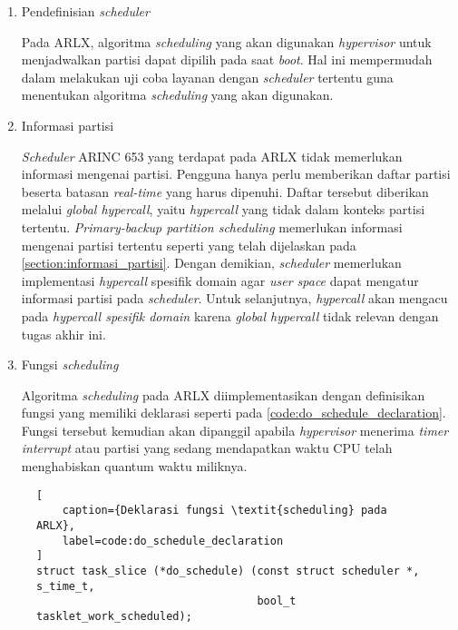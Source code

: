 \begin{enumerate}
	
	\item Pendefinisian \textit{scheduler}

		Pada ARLX, algoritma \textit{scheduling} yang akan digunakan \textit{hypervisor}
		untuk menjadwalkan partisi dapat dipilih pada saat \textit{boot}. Hal ini
		mempermudah dalam melakukan uji coba layanan dengan \textit{scheduler} tertentu
		guna menentukan algoritma \textit{scheduling} yang akan digunakan.
		
	\item Informasi partisi

		\textit{Scheduler} ARINC 653 yang terdapat pada ARLX tidak memerlukan informasi
		mengenai partisi. Pengguna hanya perlu memberikan daftar partisi beserta batasan
		\textit{real-time} yang harus dipenuhi. Daftar tersebut diberikan melalui
		\textit{global hypercall}, yaitu \textit{hypercall} yang tidak dalam konteks
		partisi tertentu. \textit{Primary-backup partition scheduling} memerlukan
		informasi mengenai partisi tertentu seperti yang telah dijelaskan pada
		\autoref{section:informasi_partisi}. Dengan demikian, \textit{scheduler}
		memerlukan implementasi \textit{hypercall} spesifik domain agar \textit{user
		space} dapat mengatur informasi partisi pada \textit{scheduler}. Untuk
		selanjutnya, \textit{hypercall} akan mengacu pada \textit{hypercall spesifik
		domain} karena \textit{global hypercall} tidak relevan dengan tugas akhir ini.
		
	\item Fungsi \textit{scheduling}

		Algoritma \textit{scheduling} pada ARLX diimplementasikan dengan definisikan
		fungsi yang memiliki deklarasi seperti pada
		\autoref{code:do_schedule_declaration}. Fungsi tersebut kemudian akan dipanggil
		apabila \textit{hypervisor} menerima \textit{timer interrupt} atau partisi yang
		sedang mendapatkan waktu CPU telah menghabiskan quantum waktu miliknya.

\end{enumerate}

\begin{figure}
\begin{lstlisting}[
	caption={Deklarasi fungsi \textit{scheduling} pada ARLX},
	label=code:do_schedule_declaration
]
struct task_slice (*do_schedule) (const struct scheduler *, s_time_t,
                                  bool_t tasklet_work_scheduled);
\end{lstlisting}
\end{figure}

